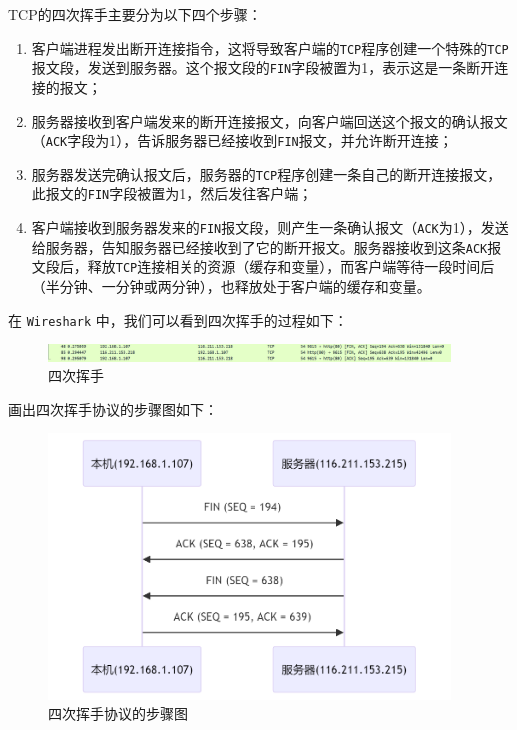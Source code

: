 \documentclass{article}
\begin{document}
TCP的四次挥手主要分为以下四个步骤：

\begin{enumerate}[noitemsep]
  \item 客户端进程发出断开连接指令，这将导致客户端的\texttt{TCP}程序创建一个特殊的\texttt{TCP}报文段，发送到服务器。这个报文段的\texttt{FIN}字段被置为1，表示这是一条断开连接的报文；
  \item 服务器接收到客户端发来的断开连接报文，向客户端回送这个报文的确认报文（\texttt{ACK}字段为1），告诉服务器已经接收到\texttt{FIN}报文，并允许断开连接；
  \item 服务器发送完确认报文后，服务器的\texttt{TCP}程序创建一条自己的断开连接报文，此报文的\texttt{FIN}字段被置为1，然后发往客户端；
  \item 客户端接收到服务器发来的\texttt{FIN}报文段，则产生一条确认报文（\texttt{ACK}为1），发送给服务器，告知服务器已经接收到了它的断开报文。服务器接收到这条\texttt{ACK}报文段后，释放\texttt{TCP}连接相关的资源（缓存和变量），而客户端等待一段时间后（半分钟、一分钟或两分钟），也释放处于客户端的缓存和变量。
\end{enumerate}

在 \texttt{Wireshark} 中，我们可以看到四次挥手的过程如下：

\begin{figure}[H]
  \centering
  \includegraphics[width=0.95\textwidth]{img/8.png}
  \caption{四次挥手}
\end{figure}

画出四次挥手协议的步骤图如下：

\begin{figure}[H]
  \centering
  \includegraphics[width=0.95\textwidth]{img/9.png}
  \caption{四次挥手协议的步骤图}
\end{figure}
\end{document}
